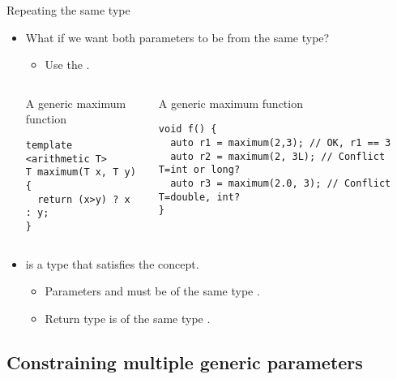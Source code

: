 \begin{frame}[t,fragile]{Repeating the same type}
\begin{itemize}
  \item What if we want both parameters to be from  the same type?
    \begin{itemize}
      \item Use the .
    \end{itemize}


\begin{columns}[T]


\begin{block}{A generic maximum function}
\begin{lstlisting}
template <arithmetic T>
T maximum(T x, T y) {
  return (x>y) ? x : y;
}
\end{lstlisting}
\end{block}


\pause
\begin{block}{A generic maximum function}
\begin{lstlisting}
void f() {
  auto r1 = maximum(2,3); // OK, r1 == 3
  auto r2 = maximum(2, 3L); // Conflict T=int or long?
  auto r3 = maximum(2.0, 3); // Conflict T=double, int?
}
\end{lstlisting}

\end{block}

\end{columns}

  \item {} is a type that satisfies the  concept.
    \begin{itemize}
      \item Parameters  and  must be of the same type .
      \item Return type is of the same type .
    \end{itemize} 

\end{itemize}
\end{frame}

\subsection{Constraining multiple generic parameters}

